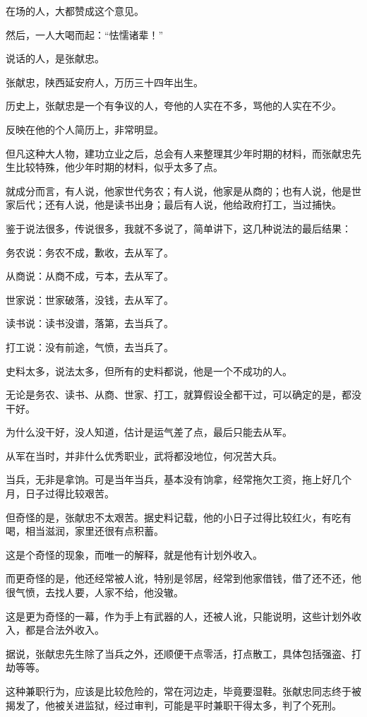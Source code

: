\begin{multicols}{\theparacolNo}
在场的人，大都赞成这个意见。

然后，一人大喝而起：“怯懦诸辈！”

说话的人，是张献忠。

张献忠，陕西延安府人，万历三十四年出生。

历史上，张献忠是一个有争议的人，夸他的人实在不多，骂他的人实在不少。

反映在他的个人简历上，非常明显。

但凡这种大人物，建功立业之后，总会有人来整理其少年时期的材料，而张献忠先生比较特殊，他少年时期的材料，似乎太多了点。

就成分而言，有人说，他家世代务农；有人说，他家是从商的；也有人说，他是世家后代；还有人说，他是读书出身；最后有人说，他给政府打工，当过捕快。

鉴于说法很多，传说很多，我就不多说了，简单讲下，这几种说法的最后结果：

务农说：务农不成，歉收，去从军了。

从商说：从商不成，亏本，去从军了。

世家说：世家破落，没钱，去从军了。

读书说：读书没谱，落第，去当兵了。

打工说：没有前途，气愤，去当兵了。

史料太多，说法太多，但所有的史料都说，他是一个不成功的人。

无论是务农、读书、从商、世家、打工，就算假设全都干过，可以确定的是，都没干好。

为什么没干好，没人知道，估计是运气差了点，最后只能去从军。

从军在当时，并非什么优秀职业，武将都没地位，何况苦大兵。

当兵，无非是拿饷。可是当年当兵，基本没有饷拿，经常拖欠工资，拖上好几个月，日子过得比较艰苦。

但奇怪的是，张献忠不太艰苦。据史料记载，他的小日子过得比较红火，有吃有喝，相当滋润，家里还很有点积蓄。

这是个奇怪的现象，而唯一的解释，就是他有计划外收入。

而更奇怪的是，他还经常被人讹，特别是邻居，经常到他家借钱，借了还不还，他很气愤，去找人要，人家不给，他没辙。

这是更为奇怪的一幕，作为手上有武器的人，还被人讹，只能说明，这些计划外收入，都是合法外收入。

据说，张献忠先生除了当兵之外，还顺便干点零活，打点散工，具体包括强盗、打劫等等。

这种兼职行为，应该是比较危险的，常在河边走，毕竟要湿鞋。张献忠同志终于被揭发了，他被关进监狱，经过审判，可能是平时兼职干得太多，判了个死刑。


\end{multicols}
